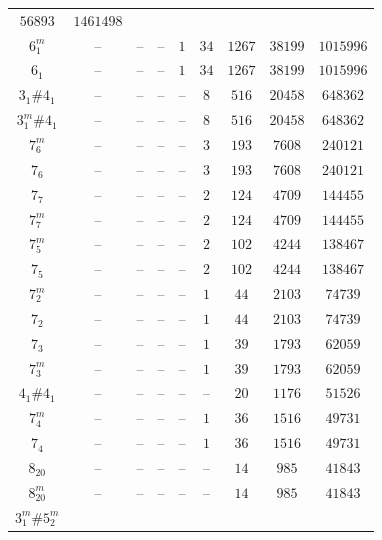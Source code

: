 \documentclass[amsmath,secnumarabic,amssymb,floatfix,nofootinbib,nobibnotes,letterpaper,11pt,tightenlines,showkeys]{revtex4}
\theoremstyle{definition}
\begin{document}
\begin{table}[H]
\begin{ruledtabular}
\begin{tabular}{ccccccccc}
$\num{56893}$ &
$\num{1461498}$\\
$6_{1}^{m}$ &
-- &
-- &
-- &
$\num{1}$ &
$\num{34}$ &
$\num{1267}$ &
$\num{38199}$ &
$\num{1015996}$\\
$6_{1}^{}$ &
-- &
-- &
-- &
$\num{1}$ &
$\num{34}$ &
$\num{1267}$ &
$\num{38199}$ &
$\num{1015996}$\\
$3_{1}^{}\#4_{1}^{}$ &
-- &
-- &
-- &
-- &
$\num{8}$ &
$\num{516}$ &
$\num{20458}$ &
$\num{648362}$\\
$3_{1}^{m}\#4_{1}^{}$ &
-- &
-- &
-- &
-- &
$\num{8}$ &
$\num{516}$ &
$\num{20458}$ &
$\num{648362}$\\
$7_{6}^{m}$ &
-- &
-- &
-- &
-- &
$\num{3}$ &
$\num{193}$ &
$\num{7608}$ &
$\num{240121}$\\
$7_{6}^{}$ &
-- &
-- &
-- &
-- &
$\num{3}$ &
$\num{193}$ &
$\num{7608}$ &
$\num{240121}$\\
$7_{7}^{}$ &
-- &
-- &
-- &
-- &
$\num{2}$ &
$\num{124}$ &
$\num{4709}$ &
$\num{144455}$\\
$7_{7}^{m}$ &
-- &
-- &
-- &
-- &
$\num{2}$ &
$\num{124}$ &
$\num{4709}$ &
$\num{144455}$\\
$7_{5}^{m}$ &
-- &
-- &
-- &
-- &
$\num{2}$ &
$\num{102}$ &
$\num{4244}$ &
$\num{138467}$\\
$7_{5}^{}$ &
-- &
-- &
-- &
-- &
$\num{2}$ &
$\num{102}$ &
$\num{4244}$ &
$\num{138467}$\\
$7_{2}^{m}$ &
-- &
-- &
-- &
-- &
$\num{1}$ &
$\num{44}$ &
$\num{2103}$ &
$\num{74739}$\\
$7_{2}^{}$ &
-- &
-- &
-- &
-- &
$\num{1}$ &
$\num{44}$ &
$\num{2103}$ &
$\num{74739}$\\
$7_{3}^{}$ &
-- &
-- &
-- &
-- &
$\num{1}$ &
$\num{39}$ &
$\num{1793}$ &
$\num{62059}$\\
$7_{3}^{m}$ &
-- &
-- &
-- &
-- &
$\num{1}$ &
$\num{39}$ &
$\num{1793}$ &
$\num{62059}$\\
$4_{1}^{}\#4_{1}^{}$ &
-- &
-- &
-- &
-- &
-- &
$\num{20}$ &
$\num{1176}$ &
$\num{51526}$\\
$7_{4}^{m}$ &
-- &
-- &
-- &
-- &
$\num{1}$ &
$\num{36}$ &
$\num{1516}$ &
$\num{49731}$\\
$7_{4}^{}$ &
-- &
-- &
-- &
-- &
$\num{1}$ &
$\num{36}$ &
$\num{1516}$ &
$\num{49731}$\\
$8_{20}^{}$ &
-- &
-- &
-- &
-- &
-- &
$\num{14}$ &
$\num{985}$ &
$\num{41843}$\\
$8_{20}^{m}$ &
-- &
-- &
-- &
-- &
-- &
$\num{14}$ &
$\num{985}$ &
$\num{41843}$\\
$3_{1}^{m}\#5_{2}^{m}$ &

\end{tabular}
\end{ruledtabular}
\end{table}
\end{document}
